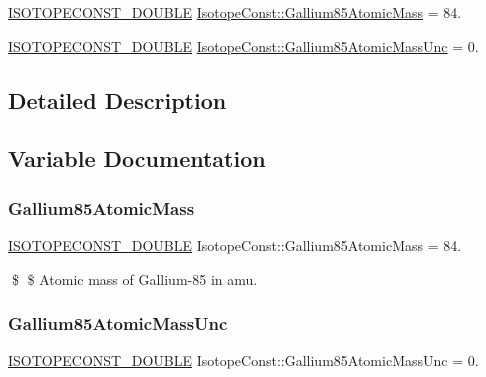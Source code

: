 \begin{DoxyCompactItemize}
\item 
\mbox{\hyperlink{group___isotope_const-_macros_ga8f45a7272ce02c0b4c65c44636ed719a}{I\+S\+O\+T\+O\+P\+E\+C\+O\+N\+S\+T\+\_\+\+D\+O\+U\+B\+LE}} \mbox{\hyperlink{group___isotope_const-_gallium-_ga85_ga7bd523ed4c450f1c721f0c3935a9ba6f}{Isotope\+Const\+::\+Gallium85\+Atomic\+Mass}} = 84.
\item 
\mbox{\hyperlink{group___isotope_const-_macros_ga8f45a7272ce02c0b4c65c44636ed719a}{I\+S\+O\+T\+O\+P\+E\+C\+O\+N\+S\+T\+\_\+\+D\+O\+U\+B\+LE}} \mbox{\hyperlink{group___isotope_const-_gallium-_ga85_gaa33ffaf88e8fae6335fd810083befa4d}{Isotope\+Const\+::\+Gallium85\+Atomic\+Mass\+Unc}} = 0.
\end{DoxyCompactItemize}


\subsection{Detailed Description}


\subsection{Variable Documentation}
\mbox{\label{group___isotope_const-_gallium-_ga85_ga7bd523ed4c450f1c721f0c3935a9ba6f}} 
\subsubsection{\texorpdfstring{Gallium85\+Atomic\+Mass}{Gallium85AtomicMass}}
{\footnotesize\ttfamily \mbox{\hyperlink{group___isotope_const-_macros_ga8f45a7272ce02c0b4c65c44636ed719a}{I\+S\+O\+T\+O\+P\+E\+C\+O\+N\+S\+T\+\_\+\+D\+O\+U\+B\+LE}} Isotope\+Const\+::\+Gallium85\+Atomic\+Mass = 84.}

\$ \$ Atomic mass of Gallium-\/85 in amu. \mbox{\label{group___isotope_const-_gallium-_ga85_gaa33ffaf88e8fae6335fd810083befa4d}} 
\subsubsection{\texorpdfstring{Gallium85\+Atomic\+Mass\+Unc}{Gallium85AtomicMassUnc}}
{\footnotesize\ttfamily \mbox{\hyperlink{group___isotope_const-_macros_ga8f45a7272ce02c0b4c65c44636ed719a}{I\+S\+O\+T\+O\+P\+E\+C\+O\+N\+S\+T\+\_\+\+D\+O\+U\+B\+LE}} Isotope\+Const\+::\+Gallium85\+Atomic\+Mass\+Unc = 0.}


